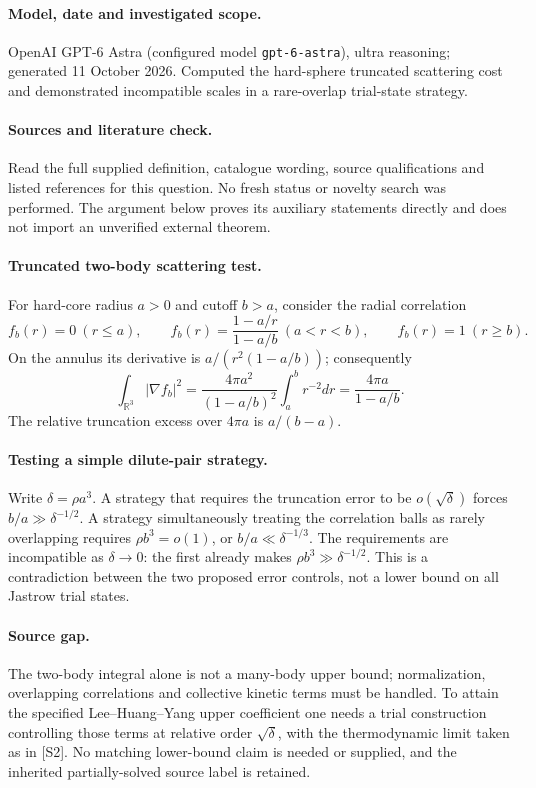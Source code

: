 \documentclass[11pt]{article}
\begin{document}
\paragraph{Model, date and investigated scope.}
OpenAI GPT-6 Astra (configured model \texttt{gpt-6-astra}), ultra reasoning; generated 11 October 2026. Computed the hard-sphere truncated scattering cost and demonstrated incompatible scales in a rare-overlap trial-state strategy.

\paragraph{Sources and literature check.}
Read the full supplied definition, catalogue wording, source qualifications and listed references for this question. No fresh status or novelty search was performed. The argument below proves its auxiliary statements directly and does not import an unverified external theorem.

\paragraph{Truncated two-body scattering test.} For hard-core radius \(a>0\) and cutoff \(b>a\), consider the radial correlation
\[
 f_b(r)=0\ (r\leq a),\qquad
 f_b(r)=\frac{1-a/r}{1-a/b}\ (a<r<b),\qquad f_b(r)=1\ (r\geq b).
\]
On the annulus its derivative is \(a/(r^2(1-a/b))\); consequently
\[
 \int_{\mathbb R^3}|\nabla f_b|^2
 =\frac{4\pi a^2}{(1-a/b)^2}\int_a^b r^{-2}dr
 =\frac{4\pi a}{1-a/b}.
\]
The relative truncation excess over \(4\pi a\) is \(a/(b-a)\).
\paragraph{Testing a simple dilute-pair strategy.} Write \(\delta=\rho a^3\). A strategy that requires the truncation error to be \(o(\sqrt\delta)\) forces \(b/a\gg\delta^{-1/2}\). A strategy simultaneously treating the correlation balls as rarely overlapping requires \(\rho b^3=o(1)\), or \(b/a\ll\delta^{-1/3}\). The requirements are incompatible as \(\delta\to0\): the first already makes \(\rho b^3\gg\delta^{-1/2}\). This is a contradiction between the two proposed error controls, not a lower bound on all Jastrow trial states.
\paragraph{Source gap.} The two-body integral alone is not a many-body upper bound; normalization, overlapping correlations and collective kinetic terms must be handled. To attain the specified Lee--Huang--Yang upper coefficient one needs a trial construction controlling those terms at relative order \(\sqrt\delta\), with the thermodynamic limit taken as in [S2]. No matching lower-bound claim is needed or supplied, and the inherited partially-solved source label is retained.
\end{document}

